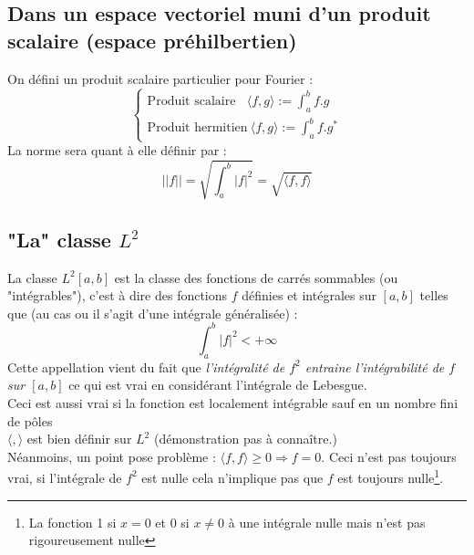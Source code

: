 \documentclass[11pt, a4paper, openany]{book}
\begin{document}
		\subsection{Dans un espace vectoriel muni d'un produit scalaire (espace préhilbertien)}
		On défini un produit scalaire particulier pour Fourier :
		\begin{equation}
			\left\{\begin{array}{l}
			\text{Produit scalaire}\ \ \ \ \langle f,g \rangle := \int_a^b f.g\\
			\text{Produit hermitien} \ \langle f,g \rangle := \int_a^b f.g^*
			\end{array}\right.
		\end{equation}
		La norme sera quant à elle définir par : 
		\begin{equation}
			||f|| = \sqrt{\int_a^b |f|^2} = \sqrt{\langle f,f\rangle}
		\end{equation}
		\subsection{"La" classe $L^2$}
		La classe $L^2[a,b]$ est la classe des fonctions de carrés sommables (ou "intégrables"), c'est à dire des fonctions $f$ définies et intégrales sur $[a,b]$ telles que (au cas ou il s'agit d'une intégrale généralisée) :
		\begin{equation}
			\int_a^b |f|^2 < +\infty
		\end{equation}
		Cette appellation vient du fait que \textit{l'intégralité de $f^2$ entraine l'intégrabilité de $f$ sur $[a,b]$} ce qui est vrai en considérant l'intégrale de Lebesgue.\\
		Ceci est aussi vrai si la fonction est localement intégrable sauf en un nombre fini de pôles\\
									
		$\langle , \rangle$ est bien définir sur $L^2$ (démonstration pas à connaître.)\\
		Néanmoins, un point pose problème : $\langle f,f \rangle \geq 0 \Rightarrow f = 0$. Ceci n'est pas toujours vrai, si l'intégrale de $f^2$ est nulle cela n'implique pas que $f$ est toujours nulle\footnote{La fonction 1 si $x=0$ et 0 si $x\neq 0$ à une intégrale nulle mais n'est pas rigoureusement nulle}.\\
									
\end{document}
